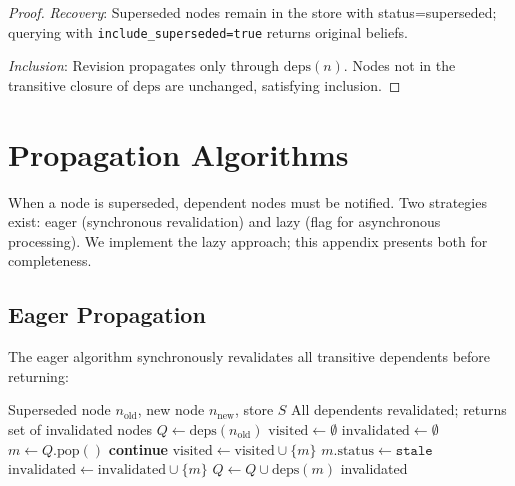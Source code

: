 \documentclass[11pt,letterpaper]{article}
\begin{document}
\begin{proof}
\textit{Recovery}: Superseded nodes remain in the store with status=superseded; querying with \texttt{include\_superseded=true} returns original beliefs.

\textit{Inclusion}: Revision propagates only through $\text{deps}(n)$. Nodes not in the transitive closure of $\text{deps}$ are unchanged, satisfying inclusion.
\end{proof}

\section{Propagation Algorithms}
\label{app:propagation}

When a node is superseded, dependent nodes must be notified. Two strategies exist: eager (synchronous revalidation) and lazy (flag for asynchronous processing). We implement the lazy approach; this appendix presents both for completeness.

\subsection{Eager Propagation}

The eager algorithm synchronously revalidates all transitive dependents before returning:

\begin{algorithm}[H]
\caption{EagerPropagate: Synchronous transitive revalidation}
\label{alg:eager}
\begin{algorithmic}[1]
\Require Superseded node $n_{\text{old}}$, new node $n_{\text{new}}$, store $S$
\Ensure All dependents revalidated; returns set of invalidated nodes
\State $Q \gets \text{deps}(n_{\text{old}})$ 
\State $\text{visited} \gets \emptyset$
\State $\text{invalidated} \gets \emptyset$
    \State $m \gets Q.\text{pop}()$
     \textbf{continue} \EndIf
    \State $\text{visited} \gets \text{visited} \cup \{m\}$
        \State $m.\text{status} \gets \texttt{stale}$
        \State $\text{invalidated} \gets \text{invalidated} \cup \{m\}$
        \State $Q \gets Q \cup \text{deps}(m)$ 
    \EndIf
\EndWhile
\State \Return invalidated
\end{algorithmic}
\end{algorithm}
\end{document}
